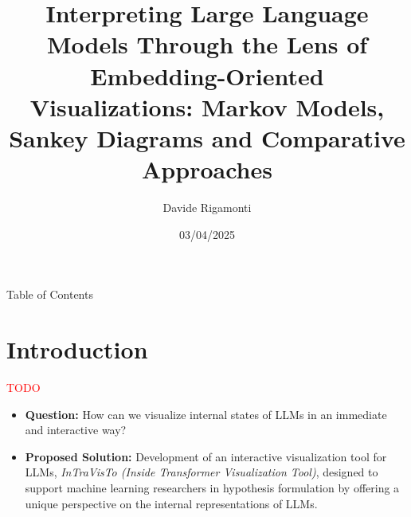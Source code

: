 \documentclass[aspectratio=169, 12pt]{beamer}
\title{Interpreting Large Language Models Through the Lens of Embedding-Oriented Visualizations: Markov Models, Sankey Diagrams and Comparative Approaches}
\author{Davide Rigamonti}
\date{03/04/2025}
\begin{document}
    \begin{frame}
        \maketitle
    \end{frame}
    
    \begin{frame}{Table of Contents}
      \tableofcontents
    \end{frame}
    
    \section{Introduction}

    \begin{frame}{}
        \textcolor{red}{TODO}
    \end{frame}

    \begin{frame}{}
        \begin{itemize}[<+|visible@+->]
            \item \textbf{Question:} How can we visualize internal states of LLMs in an immediate and interactive way?
            \item \textbf{Proposed Solution:} Development of an interactive visualization tool for LLMs, \emph{InTraVisTo (Inside Transformer Visualization Tool)}, designed to support machine learning researchers in hypothesis formulation by offering a unique perspective on the internal representations of LLMs.
        \end{itemize}
    \end{frame}
\end{document}
